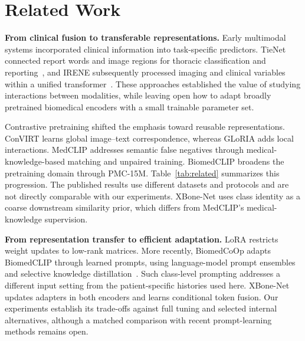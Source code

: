 \documentclass[conference,a4paper]{IEEEtran}
\begin{document}
\section{Related Work}
\textbf{From clinical fusion to transferable representations.}
Early multimodal systems incorporated clinical information into task-specific predictors. TieNet connected report words and image regions for thoracic classification and reporting~\cite{TieNet}, and IRENE subsequently processed imaging and clinical variables within a unified transformer~\cite{IRENE}. These approaches established the value of studying interactions between modalities, while leaving open how to adapt broadly pretrained biomedical encoders with a small trainable parameter set.

Contrastive pretraining shifted the emphasis toward reusable representations. ConVIRT learns global image--text correspondence, whereas GLoRIA adds local interactions. MedCLIP addresses semantic false negatives through medical-knowledge-based matching and unpaired training. BiomedCLIP broadens the pretraining domain through PMC-15M. Table~\ref{tab:related} summarizes this progression. The published results use different datasets and protocols and are not directly comparable with our experiments. XBone-Net uses class identity as a coarse downstream similarity prior, which differs from MedCLIP's medical-knowledge supervision.

\textbf{From representation transfer to efficient adaptation.}
LoRA restricts weight updates to low-rank matrices. More recently, BiomedCoOp adapts BiomedCLIP through learned prompts, using language-model prompt ensembles and selective knowledge distillation~\cite{BiomedCoOp}. Such class-level prompting addresses a different input setting from the patient-specific histories used here. XBone-Net updates adapters in both encoders and learns conditional token fusion. Our experiments establish its trade-offs against full tuning and selected internal alternatives, although a matched comparison with recent prompt-learning methods remains open.
\end{document}
